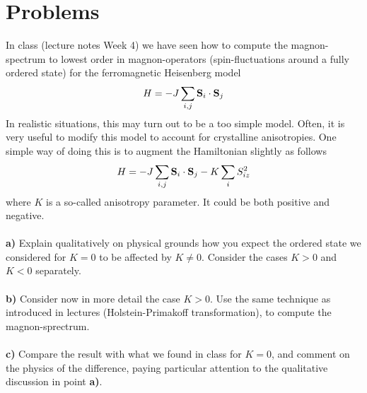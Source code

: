 \section*{Problems}
\begin{problem}
	In class (lecture notes Week 4) we have seen how to compute the magnon-spectrum to lowest order in magnon-operators (spin-fluctuations around a fully ordered state) for the ferromagnetic Heisenberg model 
	\begin{eqnarray}
		H = - J \sum_{i,j} {\bf S}_i \cdot {\bf S}_j \nonumber
	\end{eqnarray}
	In realistic situations, this may turn out to be a too simple model. Often, it is very useful to modify this model to account for crystalline anisotropies. One simple way of doing this is to augment the Hamiltonian slightly as follows 
	\begin{eqnarray}
		H = - J \sum_{i,j} {\bf S}_i \cdot {\bf S}_j  - K \sum_i S_{iz}^2 \nonumber
	\end{eqnarray}
	where $K$ is a so-called anisotropy parameter. It could be both positive and negative. 
	\ \\
	\ \\
	{\bf a)} Explain qualitatively on physical grounds how you expect the ordered state we considered for $K=0$ to be affected by $K \neq 0$. Consider the cases $K > 0$ and $K < 0$ separately.
	\ \\
	\ \\
	{\bf b)} Consider now in more detail the case $K > 0$. Use the same technique as introduced in lectures (Holstein-Primakoff transformation), to compute the magnon-sprectrum.
	\ \\
	\ \\
	{\bf c)} Compare the result with what we found in class for $K=0$, and comment on the physics of the difference, paying particular attention to the qualitative discussion in point  {\bf a)}. 
\end{problem}


